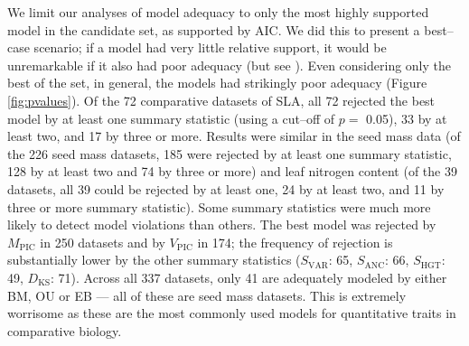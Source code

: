 \documentclass[a4paper,12pt]{article}
\begin{document}
We limit our analyses of model adequacy to only the most highly supported model in the candidate set, as supported by AIC. We did this to present a best--case scenario; if a model had very little relative support, it would be unremarkable if it also had poor adequacy (but see \citep{Ripplinger2010}). Even considering only the best of the set, in general, the models had strikingly poor adequacy (Figure \ref{fig:pvalues}). 
Of the 72 comparative datasets of SLA, all 72 rejected the best model by at least one summary statistic (using a cut--off of $p=$ 0.05), 33 by at least two, and 17 by three or more. 
Results were similar in the seed mass data (of the 226 seed mass datasets, 185 were rejected by at least one summary statistic, 128 by at least two and 74 by three or more) and leaf nitrogen content 
(of the 39 datasets, all 39 could be rejected by at least one, 24 by at least two, and 11 by three or more summary statistic). 
Some summary statistics were much more likely to detect model violations than others. The best model was rejected by $M_{\text{PIC}}$ in 250 datasets and by $V_{\text{PIC}}$ in 174; the frequency of rejection is substantially lower by the other summary statistics ($S_{\text{VAR}}$: 65, $S_{\text{ANC}}$: 66, $S_{\text{HGT}}$: 49, $D_{\text{KS}}$: 71).
Across all 337 datasets, only 41 are adequately modeled by either BM, OU or EB --- all of these are seed mass datasets. This is extremely worrisome as these are the most commonly used models for quantitative traits in comparative biology. 
\end{document}
